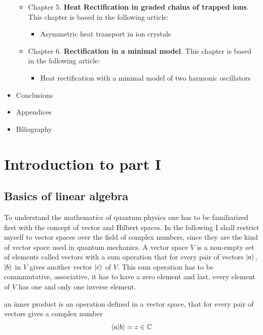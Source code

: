 \begin{itemize}
\begin{itemize}
      \item Chapter 5. \textbf{Heat Rectification in graded chains of trapped ions}.
      This chapter is based in the following article:

      \begin{itemize}
        \item Asymmetric heat transport in ion crystals
      \end{itemize}

      \item Chapter 6. \textbf{Rectification in a minimal model}.
      This chapter is based in the following article:

      \begin{itemize}
        \item Heat rectification with a minimal model of two harmonic oscillators
      \end{itemize}

    \end{itemize}

  \item Conclusions

  \item Appendices

  \item Biliography
\end{itemize}

\section*{Introduction to part I}

\subsection*{Basics of linear algebra}

To understand the mathematics of quantum physics one has to be familiarized first with the concept of vector and Hilbert spaces. In the following I shall restrict myself to vector spaces over the field of complex numbers, since they are the kind of vector space used in quantum mechanics. A vector space $V$ is a non-empty set of elements called vectors with a sum operation that for every pair of vectors $\ket{a}$, $\ket{b}$ in $V$ gives another vector $\ket{c}$ of $V$. This sum operation has to be commmutative, associative, it has to have a zero element and last, every element of $V$ has one and only one inverse element.

an inner product is an operation defined in a vector space, that for every pair of vectors gives a complex number
%
\begin{equation}
  \braket{a}{b} = z \in \mathbb{C}
\end{equation}
%

